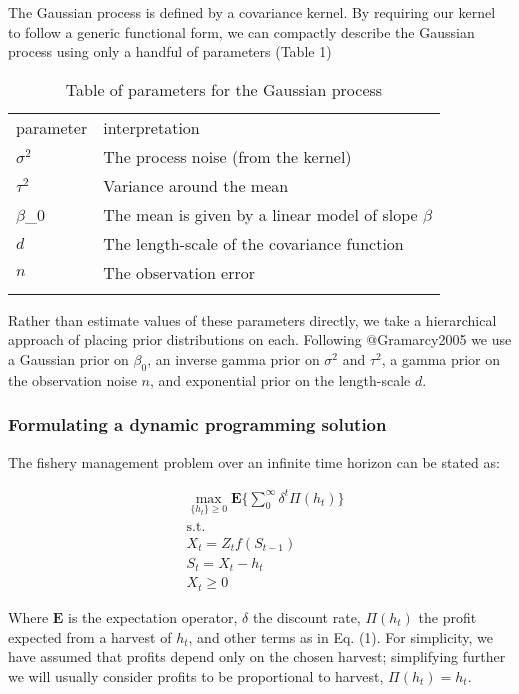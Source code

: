 \documentclass[author-year, review]{elsarticle} %
\begin{document}
The Gaussian process is defined by a covariance kernel. By requiring our
kernel to follow a generic functional form, we can compactly describe
the Gaussian process using only a handful of parameters (Table 1)

\begin{longtable}[c]{@{}ll@{}}
\hline\noalign{\medskip}
parameter & interpretation
\\\noalign{\medskip}
\hline\noalign{\medskip}
$\sigma^2$ & The process noise (from the kernel)
\\\noalign{\medskip}
$\tau^2$ & Variance around the mean
\\\noalign{\medskip}
$\beta$\_0 & The mean is given by a linear model of slope $\beta$
\\\noalign{\medskip}
$d$ & The length-scale of the covariance function
\\\noalign{\medskip}
$n$ & The observation error
\\\noalign{\medskip}
\hline
\noalign{\medskip}
\caption{Table of parameters for the Gaussian process}
\end{longtable}

Rather than estimate values of these parameters directly, we take a
hierarchical approach of placing prior distributions on each. Following
@Gramarcy2005 we use a Gaussian prior on $\beta_0$, an inverse gamma
prior on $\sigma^2$ and $\tau^2$, a gamma prior on the observation noise
$n$, and exponential prior on the length-scale $d$.

\subsubsection{Formulating a dynamic programming solution}

The fishery management problem over an infinite time horizon can be
stated as:

\begin{align}
& \max_{ \{h_t\} \geq 0 } \mathbf{E} \lbrace \sum_0^\infty \delta^t \Pi(h_t) \rbrace \\
& \mathrm{s.t.}  \\
 & X_t = Z_t f\left(S_{t-1}\right) \\
 & S_t = X_t - h_t \\
 & X_t  \geq 0 
\end{align}

Where $\mathbf{E}$ is the expectation operator, $\delta$ the discount
rate, $\Pi(h_t)$ the profit expected from a harvest of $h_t$, and other
terms as in Eq. (1). For simplicity, we have assumed that profits depend
only on the chosen harvest; simplifying further we will usually consider
profits to be proportional to harvest, $\Pi(h_t) = h_t$.
\end{document}
